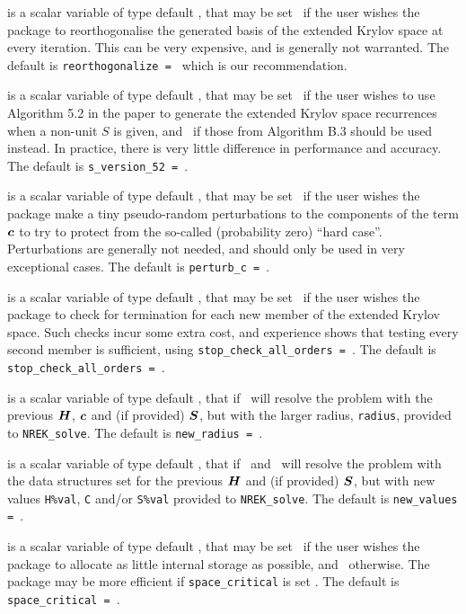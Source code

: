 \documentclass{galahad}
\newcommand{\packagename}{NREK}
\begin{document}
\begin{description}
 is a scalar variable of type default \logical, that
may be set \true\ if the user wishes the package to reorthogonalise
the generated basis of the extended Krylov space at every iteration.
This can be very expensive, and is generally not warranted.
The default is {\tt reorthogonalize = \false} which is our recommendation.

 is a scalar variable of type default \logical, that
may be set \true\ if the user wishes to use Algorithm 5.2 in the
paper to generate the extended Krylov space recurrences when a non-unit $S$
is given, and \false\ if those from Algorithm B.3 should be used instead.
In practice, there is very little difference in performance and accuracy.
The default is {\tt s\_version\_52 = \true}.

 is a scalar variable of type default \logical, that
may be set \true\ if the user wishes the package make a tiny 
pseudo-random perturbations to the components of the term ${\bm{c}}$ 
to try to protect from the so-called (probability zero) ``hard case''.
Perturbations are generally not needed, and should only be used in
very exceptional cases.
The default is {\tt perturb\_c = \false}.

 is a scalar variable of type default \logical, 
that may be set \true\ if the user wishes the package to check for termination
for each new member of the extended Krylov space. Such checks incur some extra
cost, and experience shows that testing every second member is sufficient, 
using {\tt stop\_check\_all\_orders = \false}.
The default is {\tt stop\_check\_all\_orders = \false}.

 is a scalar variable of type 
default \logical, that if \true\ will resolve the 
problem with the previous ${\bm{H}}$, ${\bm{c}}$ and (if provided) ${\bm{S}}$, but
with the larger radius, {\tt radius}, 
provided to {\tt \packagename\_solve}.
The default is {\tt new\_radius = \false}.

 is a scalar variable of type 
default \logical, that if \present\ and \true\ will resolve the 
problem with the data structures set for the previous 
${\bm{H}}$ and (if provided) ${\bm{S}}$, but with new values {\tt H\%val}, {\tt C} 
and/or {\tt S\%val} provided to {\tt \packagename\_solve}.
The default is {\tt new\_values = \false}.

 is a scalar variable of type default \logical, that
may be set \true\ if the user wishes the package to allocate as little
internal storage as possible, and \false\ otherwise. The package may
be more efficient if {\tt space\_critical} is set \false.
The default is {\tt space\_critical = \false}.


\end{description}
\end{document}
